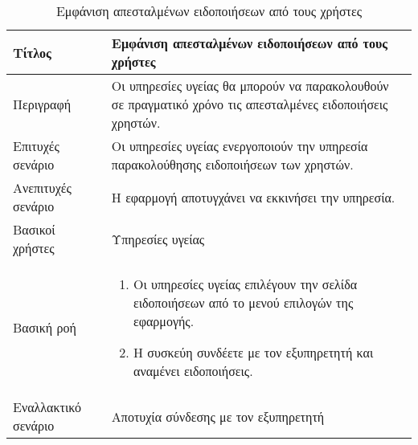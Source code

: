 \begin{table}[h]
 \caption{Εμφάνιση απεσταλμένων ειδοποιήσεων από τους χρήστες}
\begin{center}
\begin{tabular}{ | m{10em} |  m{25em} | } 
\hline
 Τίτλος & Εμφάνιση απεσταλμένων ειδοποιήσεων από τους χρήστες \\ 
\hline
 Περιγραφή & Οι υπηρεσίες υγείας θα μπορούν να παρακολουθούν σε πραγματικό χρόνο τις απεσταλμένες ειδοποιήσεις χρηστών.\\ 
\hline
 Επιτυχές σενάριο & Οι υπηρεσίες υγείας ενεργοποιούν την υπηρεσία παρακολούθησης ειδοποιήσεων των χρηστών.\\
\hline
 Ανεπιτυχές σενάριο  & Η εφαρμογή αποτυγχάνει να εκκινήσει την υπηρεσία. \\ 
\hline
 Βασικοί χρήστες  & Υπηρεσίες υγείας \\ 
\hline
 Βασική ροή  & 
\begin{enumerate}
\item Οι υπηρεσίες υγείας επιλέγουν την σελίδα ειδοποιήσεων από το μενού επιλογών της εφαρμογής.
\item Η συσκεύη συνδέετε με τον εξυπηρετητή και αναμένει ειδοποιήσεις.
\end{enumerate}
 \\ 
\hline
 Εναλλακτικό σενάριο  & Αποτυχία σύνδεσης με τον εξυπηρετητή \\ 
\hline
\end{tabular}
\end{center}
\end{table}


